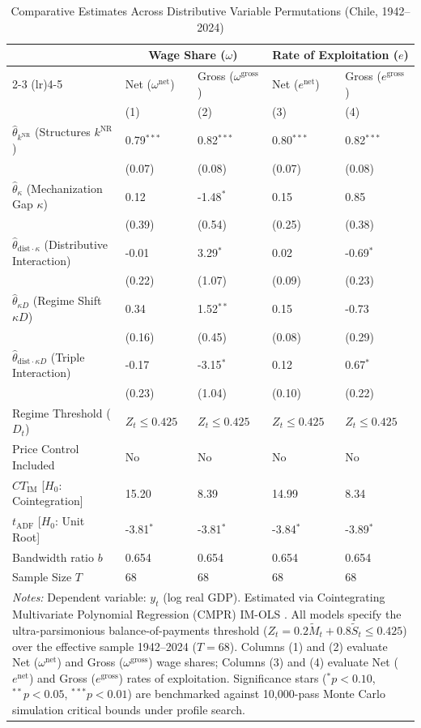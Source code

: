 \begin{table}[h!]
	\centering
	\caption{Comparative Estimates Across Distributive Variable Permutations (Chile, 1942--2024)}
	\label{tab:chile_distributive_comparison_main}
	\small
	\begin{tabular}{p{5.0cm}p{2.2cm}p{2.2cm}p{2.2cm}p{2.2cm}}
		\toprule
		& \multicolumn{2}{c}{Wage Share ($\omega$)} & \multicolumn{2}{c}{Rate of Exploitation ($e$)} \\
		\cmidrule(lr){2-3} \cmidrule(lr){4-5}
		& Net ($\omega^{\text{net}}$) & Gross ($\omega^{\text{gross}}$) & Net ($e^{\text{net}}$) & Gross ($e^{\text{gross}}$) \\
		& (1) & (2) & (3) & (4) \\
		\midrule
		$\hat{\theta}_{k^{\text{NR}}}$ (Structures $k^{\text{NR}}$) & 0.79$^{***}$ & 0.82$^{***}$ & 0.80$^{***}$ & 0.82$^{***}$ \\
		& (0.07) & (0.08) & (0.07) & (0.08) \\
		$\hat{\theta}_{\kappa}$ (Mechanization Gap $\kappa$) & 0.12 & -1.48$^{*}$ & 0.15 & 0.85 \\
		& (0.39) & (0.54) & (0.25) & (0.38) \\
		$\hat{\theta}_{\text{dist}\cdot\kappa}$ (Distributive Interaction) & -0.01 & 3.29$^{*}$ & 0.02 & -0.69$^{*}$ \\
		& (0.22) & (1.07) & (0.09) & (0.23) \\
		$\hat{\theta}_{\kappa D}$ (Regime Shift $\kappa D$) & 0.34 & 1.52$^{**}$ & 0.15 & -0.73 \\
		& (0.16) & (0.45) & (0.08) & (0.29) \\
		$\hat{\theta}_{\text{dist}\cdot\kappa D}$ (Triple Interaction) & -0.17 & -3.15$^{*}$ & 0.12 & 0.67$^{*}$ \\
		& (0.23) & (1.04) & (0.10) & (0.22) \\
		\midrule
		Regime Threshold ($D_t$) & $Z_t \le 0.425$ & $Z_t \le 0.425$ & $Z_t \le 0.425$ & $Z_t \le 0.425$ \\
		Price Control Included & No & No & No & No \\
		$CT_{\text{IM}}$ [$H_0$: Cointegration] & 15.20 & 8.39 & 14.99 & 8.34 \\
		$t_{\text{ADF}}$ [$H_0$: Unit Root] & -3.81$^{*}$ & -3.81$^{*}$ & -3.84$^{*}$ & -3.89$^{*}$ \\
		Bandwidth ratio $b$ & 0.654 & 0.654 & 0.654 & 0.654 \\
		Sample Size $T$ & 68 & 68 & 68 & 68 \\
		\bottomrule
		\multicolumn{5}{p{14.2cm}}{\footnotesize \textit{Notes:} Dependent variable: $y_t$ (log real GDP). Estimated via Cointegrating Multivariate Polynomial Regression (CMPR) IM-OLS \citep{VogelsangWagner2024}. All models specify the ultra-parsimonious balance-of-payments threshold ($Z_t = 0.2 \tilde{M}_t + 0.8 \tilde{S}_t \le 0.425$) over the effective sample 1942--2024 ($T=68$). Columns (1) and (2) evaluate Net ($\omega^{\text{net}}$) and Gross ($\omega^{\text{gross}}$) wage shares; Columns (3) and (4) evaluate Net ($e^{\text{net}}$) and Gross ($e^{\text{gross}}$) rates of exploitation. Significance stars ($^*p<0.10$, $^{**}p<0.05$, $^{***}p<0.01$) are benchmarked against 10,000-pass Monte Carlo simulation critical bounds under profile search.} \\

\end{tabular}
\end{table}
